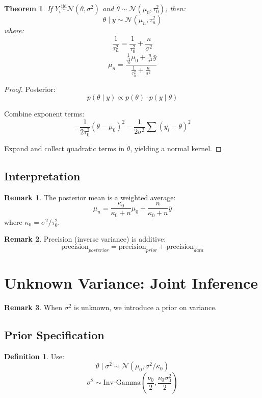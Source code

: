 \documentclass[12pt,oneside]{book}
\numberwithin{equation}{section}
\theoremstyle{definition}
\newtheorem{definition}{Definition}[section]
\newtheorem{remark}{Remark}[section]
\theoremstyle{plain}
\newtheorem{theorem}{Theorem}[section]
\theoremstyle{remark}
\newcommand{\iid}{\overset{\text{iid}}{\sim}}
\newcommand{\Normal}{\mathcal{N}}
\newcommand{\InvGam}{\mathrm{Inv\text{-}Gamma}}
\begin{document}
\begin{theorem}
If $Y_i \iid \Normal(\theta, \sigma^2)$ and $\theta \sim \Normal(\mu_0, \tau_0^2)$, then:
$$
\theta \mid y \sim \Normal(\mu_n, \tau_n^2)
$$
where:
$$
\frac{1}{\tau_n^2} = \frac{1}{\tau_0^2} + \frac{n}{\sigma^2}
$$
$$
\mu_n =
\frac{\frac{1}{\tau_0^2}\mu_0 + \frac{n}{\sigma^2}\bar{y}}
{\frac{1}{\tau_0^2} + \frac{n}{\sigma^2}}
$$
\end{theorem}

\begin{proof}
Posterior:
$$
p(\theta \mid y) \propto p(\theta)\cdot p(y \mid \theta)
$$

Combine exponent terms:
$$
-\frac{1}{2\tau_0^2}(\theta - \mu_0)^2
-
\frac{1}{2\sigma^2}\sum (y_i - \theta)^2
$$

Expand and collect quadratic terms in $\theta$, yielding a normal kernel.
\end{proof}

\subsection{Interpretation}

\begin{remark}
The posterior mean is a weighted average:
$$
\mu_n =
\frac{\kappa_0}{\kappa_0 + n}\mu_0
+
\frac{n}{\kappa_0 + n}\bar{y}
$$
where $\kappa_0 = \sigma^2/\tau_0^2$.
\end{remark}

\begin{remark}
Precision (inverse variance) is additive:
$$
\text{precision}_{posterior}
=
\text{precision}_{prior}
+
\text{precision}_{data}
$$
\end{remark}

\section{Unknown Variance: Joint Inference}

\begin{remark}
When $\sigma^2$ is unknown, we introduce a prior on variance.
\end{remark}

\subsection{Prior Specification}

\begin{definition}
Use:
$$
\theta \mid \sigma^2 \sim \Normal(\mu_0, \sigma^2/\kappa_0)
$$
$$
\sigma^2 \sim \InvGam\left(\frac{\nu_0}{2}, \frac{\nu_0\sigma_0^2}{2}\right)
$$
\end{definition}
\end{document}

